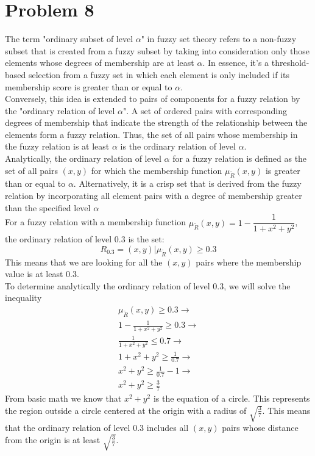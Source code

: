 \section{Problem 8}
The term "ordinary subset of level $\alpha$" in fuzzy set theory refers to a non-fuzzy subset that is created from a fuzzy subset by taking into consideration only those elements whose degrees of membership are at least $\alpha$. In essence, it's a threshold-based selection from a fuzzy set in which each element is only included if its membership score is greater than or equal to $\alpha$.\\
Conversely, this idea is extended to pairs of components for a fuzzy relation by the "ordinary relation of level $\alpha$". A set of ordered pairs with corresponding degrees of membership that indicate the strength of the relationship between the elements form a fuzzy relation. Thus, the set of all pairs whose membership in the fuzzy relation is at least $\alpha$ is the ordinary relation of level $\alpha$.\\

Analytically, the ordinary relation of level $\alpha$ for a fuzzy relation is defined as the set of all pairs $(x,y)$ for which the membership function $\mu_{\tilde{R}}(x,y)$ is greater than or equal to $\alpha$. Alternatively, it is a crisp set that is derived from the fuzzy relation by incorporating all element pairs with a degree of membership greater than the specified level $\alpha$\\

For a fuzzy relation with a membership function $\mu_{\tilde{R}}(x,y) = 1 - \dfrac{1}{1+x^2+y^2}$, the ordinary relation of level $0.3$ is the set:\\
\begin{equation}
	R_{0.3} = {(x,y) | \mu_{\tilde{R}}(x,y) \geq 0.3}
\end{equation}
This means that we are looking for all the $(x,y)$ pairs where the membership value is at least $0.3$.\\

To determine analytically the ordinary relation of level $0.3$, we will solve the inequality
\begin{align*}
	\mu_{\tilde{R}}(x,y) \geq 0.3 \rightarrow \\
	1 - \frac{1}{1+x^2+y^2} \geq 0.3 \rightarrow \\
	\frac{1}{1+x^2+y^2} \leq 0.7 \rightarrow \\
	1 + x^2 + y^2 \geq \frac{1}{0.7} \rightarrow \\
	x^2 + y^2 \geq \frac{1}{0.7} - 1 \rightarrow \\
	x^2+y^2 \geq \frac{3}{7}
\end{align*}
From basic math we know that $	x^2 + y^2$ is the equation of a circle. This represents the region outside a circle centered at the origin with a radius of $\sqrt{\frac{3}{7}}$. This means that the ordinary relation of level 
$0.3$ includes all $(x,y)$ pairs whose distance from the origin is at least 
$\sqrt{\frac{3}{7}}$.\\

